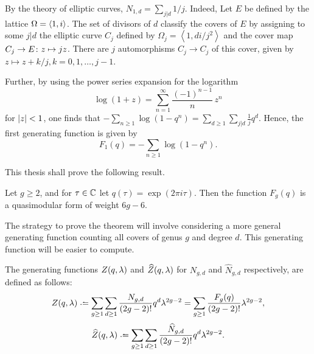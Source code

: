 \begin{expl}
 By the theory of elliptic curves, $N_{1,d}=\sum_{j|d}1/j$. Indeed, Let $E$ be defined by the lattice $\Omega=\left\langle 1,i \right\rangle$. The set of divisors of $d$ classify the covers of $E$ by assigning to some $j|d$ the elliptic curve $C_j$ defined by $\Omega_j=\left<1,di/j^2\right>$ and the cover map $C_j\to E\colon z\mapsto jz$. There are $j$ automorphisms $C_j\to C_j$ of this cover, given by $z\mapsto z+k/j, k=0,1,\dotsc,j-1$.
 
 Further, by using the power series expansion for the logarithm \[\log(1+z)=\sum_{n=1}^{\infty}\frac{(-1)^{n-1}}{n}\,z^n\] for $|z|<1$, one finds that $-\sum_{n\geq 1}\log(1-q^n)=\sum_{d\geq 1}\sum_{j|d}\frac{1}{j}q^d.$
 Hence, the first generating function is given by \[F_1(q)=-\sum_{n\geq 1}\log(1-q^n).\]
\end{expl}

This thesis shall prove the following result.

\begin{thm}
 Let $g\geq 2$, and for $\tau\in\mathbb{C}$ let $q(\tau)=\exp(2\pi i\tau)$. Then the function $F_g(q)$ is a quasimodular form of weight $6g-6$.
\end{thm}

The strategy to prove the theorem will involve considering a more general generating function counting all covers of genus $g$ and degree $d$. This generating function will be easier to compute.

\begin{defi}
 The generating functions $Z(q,\lambda)$ and $\widehat{Z}(q,\lambda)$ for $N_{g,d}$ and $\widehat{N}_{g,d}$ respectively, are defined as follows:
 \[Z(q,\lam) \defeq \sum_{g\geq 1}\sum_{d\geq 1} \frac{N_{g,d}}{(2g-2)!}q^d\lam^{2g-2} 
 = \sum_{g\geq 1}\frac{F_g(q)}{(2g-2)!}\lam^{2g-2},\]
 \[\widehat{Z}(q,\lam) \defeq \sum_{g\geq 1}\sum_{d\geq 1} \frac{\widehat{N}_{g,d}}{(2g-2)!}q^d\lam^{2g-2}.\]
\end{defi}

